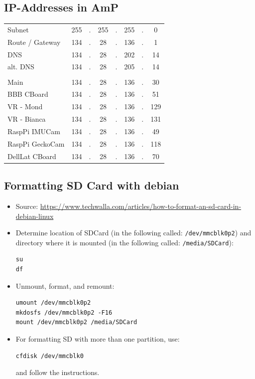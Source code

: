 \documentclass[
	fontsize=10pt
	paper=a4
]{scrartcl}
\begin{document}
\subsection{IP-Addresses in AmP}
\begin{tabular}{l|ccccccc}
Subnet 		& 255 &.& 255 &.& 255 &.& 0 \\
Route / Gateway 	& 134 &.& 28  &.& 136 &.& 1 \\
DNS	 	& 134 &.& 28  &.& 202 &.& 14 \\
alt. DNS 	& 134 &.& 28  &.& 205 &.& 14 \\ \hline
\\
Main	 	& 134 &.& 28  &.& 136 &.& 30 \\
BBB CBoard 	& 134 &.& 28  &.& 136 &.& 51 \\
VR - Mond 	& 134 &.& 28  &.& 136 &.& 129 \\
VR - Bianca	& 134 &.& 28  &.& 136 &.& 131 \\
RaspPi IMUCam 	& 134 &.& 28  &.& 136 &.& 49 \\
RaspPi GeckoCam	& 134 &.& 28  &.& 136 &.& 118 \\
DellLat CBoard 	& 134 &.& 28  &.& 136 &.& 70 \\


\end{tabular}



\subsection{Formatting SD Card with debian}

\begin{itemize}
\item Source: \url{https://www.techwalla.com/articles/how-to-format-an-sd-card-in-debian-linux}

\item Determine location of SDCard (in the following called: \texttt{/dev/mmcblk0p2}) and directory where it is mounted (in the following called: \texttt{/media/SDCard}):
\begin{lstlisting}
su
df
\end{lstlisting}

\item Unmount, format, and remount:
\begin{lstlisting}
umount /dev/mmcblk0p2
mkdosfs /dev/mmcblk0p2 -F16
mount /dev/mmcblk0p2 /media/SDCard
\end{lstlisting}

\item For formatting SD with more than one partition, use:
\begin{lstlisting}
cfdisk /dev/mmcblk0
\end{lstlisting}
and follow the instructions.
\end{itemize}
\end{document}

